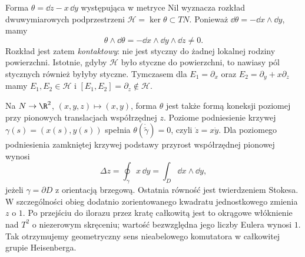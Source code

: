 
\begin{przyklad}
\label{prz:thur-dop-nil-kontakt}
Forma $\theta=\dd z-x\,\dd y$ występująca w metryce Nil
wyznacza rozkład dwuwymiarowych podprzestrzeni
$\mathcal H=\ker\theta\subset TN$.
Ponieważ $\dd\theta=-\dd x\wedge\dd y$, mamy
\[
 \theta\wedge\dd\theta=-\dd x\wedge\dd y\wedge\dd z\ne0.
\]
Rozkład jest zatem \emph{kontaktowy}: nie jest styczny
do żadnej lokalnej rodziny powierzchni. Istotnie, gdyby
$\mathcal H$ było styczne do powierzchni, to nawiasy pól
stycznych również byłyby styczne. Tymczasem dla
$E_1=\partial_x$ oraz $E_2=\partial_y+x\partial_z$
mamy $E_1,E_2\in\mathcal H$ i
$[E_1,E_2]=\partial_z\notin\mathcal H$.

Na $N\to\R^2$, $(x,y,z)\mapsto(x,y)$,
forma $\theta$ jest także formą koneksji poziomej
przy pionowych translacjach współrzędnej $z$.
Poziome podniesienie krzywej $\gamma(s)=(x(s),y(s))$
spełnia $\theta(\dot{\widetilde\gamma})=0$, czyli
$\dot z=x\dot y$. Dla poziomego podniesienia zamkniętej
krzywej podstawy przyrost współrzędnej pionowej wynosi
\begin{equation}\label{eq:thur-dop-nil-holonomia-pola}
 \Delta z=\oint_\gamma x\,\dd y
 =\int_D\dd x\wedge\dd y,
\end{equation}
jeżeli $\gamma=\partial D$ z orientacją brzegową.
Ostatnia równość jest twierdzeniem Stokesa.
W szczególności obieg dodatnio zorientowanego
kwadratu jednostkowego zmienia $z$ o $1$.
Po przejściu do ilorazu przez kratę całkowitą jest to
okrągowe włóknienie nad $T^2$ o niezerowym skręceniu;
wartość bezwzględna jego liczby Eulera wynosi $1$.
Tak otrzymujemy geometryczny sens nieabelowego
komutatora w całkowitej grupie Heisenberga.
\end{przyklad}
